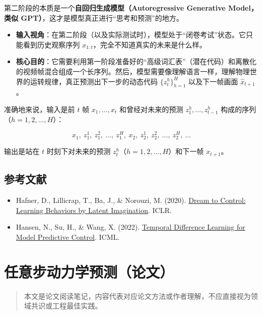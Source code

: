 第二阶段的本质是一个\textbf{自回归生成模型（Autoregressive Generative Model，类似 GPT）}，这才是模型真正进行``思考和预测''的地方。

\begin{itemize}
\tightlist
\item
  \textbf{输入视角}：在第二阶段（以及实际测试时），模型处于``闭卷考试''状态。它只能看到历史观察序列 \(x_{1:t}\)，完全不知道真实的未来是什么样。
\item
  \textbf{核心目的}：它需要利用第一阶段准备好的``高级词汇表''（潜在代码）和离散化的视频帧混合组成一个长序列。然后，模型需要像理解语言一样，理解物理世界的运转规律，真正预测出下一步的动态代码 \(\{z_t^h\}_{h=1}^H\) 以及下一帧画面 \(\hat{x}_{t+1}\)。
\end{itemize}

准确地来说，输入是前 \(t\) 帧 \(x_1,\ldots,x_t\) 和曾经对未来的预测 \(z_1^h,\ldots,z_{t-1}^h\) 构成的序列（\(h=1,2,\ldots,H\)）：

\[
x_1,\ z_1^1,\ z_1^2,\ \ldots,\ z_1^H,\ x_2,\ z_2^1,\ z_2^2,\ \ldots,\ z_2^H,\ \ldots
\]

输出是站在 \(t\) 时刻下对未来的预测 \(z_t^h\)（\(h=1,2,\ldots,H\)）和下一帧 \(x_{t+1}\)。

\hypertarget{ux53c2ux8003ux6587ux732e-186}{%
\subsection{参考文献}\label{ux53c2ux8003ux6587ux732e-186}}

\begin{itemize}
\tightlist
\item
  Hafner, D., Lillicrap, T., Ba, J., \& Norouzi, M. (2020). \href{https://arxiv.org/abs/1912.01603}{Dream to Control: Learning Behaviors by Latent Imagination}. ICLR.
\item
  Hansen, N., Su, H., \& Wang, X. (2022). \href{https://arxiv.org/abs/2203.04955}{Temporal Difference Learning for Model Predictive Control}. ICML.
\end{itemize}

\clearpage

\hypertarget{ux4efbux610fux6b65ux52a8ux529bux5b66ux9884ux6d4bux8bbaux6587}{%
\section{任意步动力学预测（论文）}\label{ux4efbux610fux6b65ux52a8ux529bux5b66ux9884ux6d4bux8bbaux6587}}

\begin{quote}
本文是论文阅读笔记，内容代表对应论文方法或作者理解，不应直接视为领域共识或工程最佳实践。
\end{quote}

